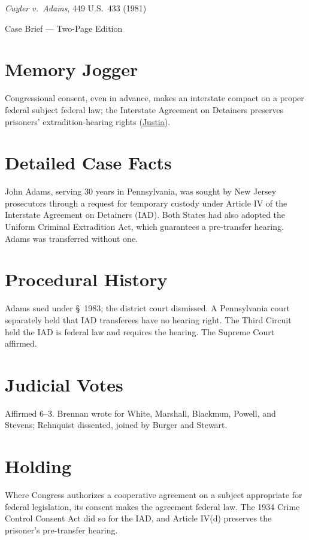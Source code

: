 \documentclass[12pt]{article}
\begin{document}
\begin{center}
{\LARGE \textit{Cuyler v.\ Adams}, 449 U.S.\ 433 (1981)\par}
\vspace{0.5em}
{\large Case Brief --- Two-Page Edition\par}
\end{center}

\section{Memory Jogger}
Congressional consent, even in advance, makes an interstate compact on a proper federal subject federal law; the Interstate Agreement on Detainers preserves prisoners' extradition-hearing rights (\href{https://supreme.justia.com/cases/federal/us/449/433/}{Justia}).

\section{Detailed Case Facts}
John Adams, serving 30 years in Pennsylvania, was sought by New Jersey prosecutors through a request for temporary custody under Article IV of the Interstate Agreement on Detainers (IAD). Both States had also adopted the Uniform Criminal Extradition Act, which guarantees a pre-transfer hearing. Adams was transferred without one.

\section{Procedural History}
Adams sued under \S~1983; the district court dismissed. A Pennsylvania court separately held that IAD transferees have no hearing right. The Third Circuit held the IAD is federal law and requires the hearing. The Supreme Court affirmed.

\section{Judicial Votes}
Affirmed 6--3. Brennan wrote for White, Marshall, Blackmun, Powell, and Stevens; Rehnquist dissented, joined by Burger and Stewart.

\section{Holding}
Where Congress authorizes a cooperative agreement on a subject appropriate for federal legislation, its consent makes the agreement federal law. The 1934 Crime Control Consent Act did so for the IAD, and Article IV(d) preserves the prisoner's pre-transfer hearing.
\end{document}
